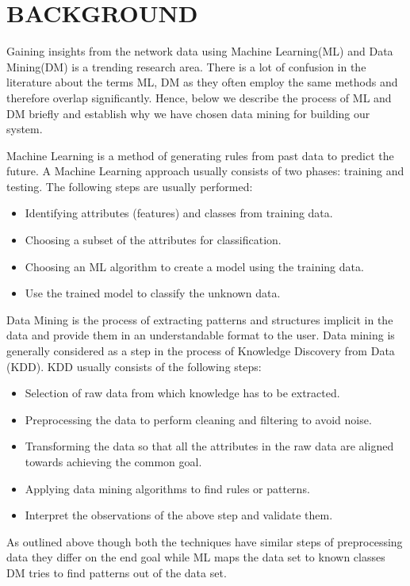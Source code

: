 
\chapter{BACKGROUND}

Gaining insights from the network data using Machine Learning(ML) and Data Mining(DM) is a trending research area. There is a lot of confusion in the literature about the terms ML, DM as they often employ the same methods and therefore overlap significantly. Hence, below we describe the process of ML and DM briefly and establish why we have chosen data mining for building our system.

Machine Learning is a method of generating rules from past data to predict the future.
A Machine Learning approach usually consists of two phases:
training and testing. The following steps are usually performed:
\begin{itemize}
	\item Identifying attributes (features) and classes from training data.
	\item Choosing a subset of the attributes for classification.
	\item Choosing an ML algorithm to create a model using the training data.
	\item Use the trained model to classify the unknown data.
\end{itemize}	

Data Mining is the process of extracting patterns and structures implicit in the data and provide them in an understandable format to the user. Data mining is generally considered as a step in the process of Knowledge Discovery from Data (KDD). KDD usually consists of the following steps:
\begin{itemize}
	\item Selection of raw data from which knowledge has to be extracted.
	\item Preprocessing the data to perform cleaning and filtering to avoid noise.
	\item Transforming the data so that all the attributes in the raw data are aligned towards achieving the common goal. 
	\item Applying data mining algorithms to find rules or patterns.
	\item Interpret the observations of the above step and validate them.
	
\end{itemize}

As outlined above though both the techniques have similar steps of preprocessing data they differ on the end goal while ML maps the data set to known classes DM tries to find patterns out of the data set.


